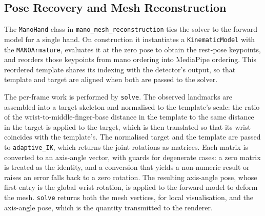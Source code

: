 \subsection{Pose Recovery and Mesh Reconstruction}\label{subsec:mesh_recon}

The \texttt{ManoHand} class in \texttt{mano\_mesh\_reconstruction} ties the solver
to the forward model for a single hand. On construction it instantiates a
\texttt{KinematicModel} with the \texttt{MANOArmature}, evaluates it at the zero
pose to obtain the rest-pose keypoints, and reorders those keypoints from
\acrshort{mano} ordering into MediaPipe ordering. This reordered template shares
its indexing with the detector's output, so that template and target are aligned
when both are passed to the solver.

The per-frame work is performed by \texttt{solve}. The observed landmarks are
assembled into a target skeleton and normalised to the template's scale: the ratio
of the wrist-to-middle-finger-base distance in the template to the same distance
in the target is applied to the target, which is then translated so that its wrist
coincides with the template's. The normalised target and the template are passed
to \texttt{adaptive\_IK}, which returns the joint rotations as matrices. Each
matrix is converted to an axis-angle vector, with guards for degenerate cases: a
zero matrix is treated as the identity, and a conversion that yields a
non-numeric result or raises an error falls back to a zero rotation. The resulting
axis-angle pose, whose first entry is the global wrist rotation, is applied to the
forward model to deform the mesh. \texttt{solve} returns both the mesh vertices,
for local visualisation, and the axis-angle pose, which is the quantity
transmitted to the renderer.
